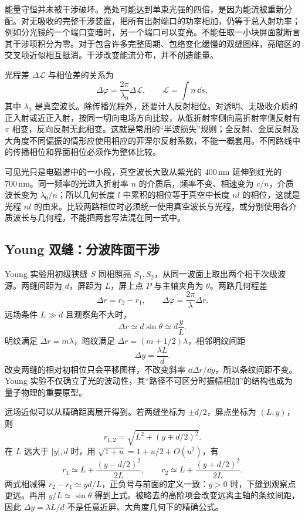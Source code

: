 能量守恒并未被干涉破坏。亮处可能达到单束光强的四倍，是因为能流被重新分配。对无吸收的完整干涉装置，把所有出射端口的功率相加，仍等于总入射功率；例如分光镜的一个端口变暗时，另一个端口可以变亮。不能任取一小块屏面就断言其干涉项积分为零。对于包含许多完整周期、包络变化缓慢的双缝图样，亮暗区的交叉项近似相互抵消。干涉改变能流分布，并不创造能量。

光程差 $\Delta\mathcal L$ 与相位差的关系为
\begin{equation}
 \Delta\varphi=\frac{2\pi}{\lambda_0}\Delta\mathcal L,\qquad
 \mathcal L=\int n\,\dd s,
\end{equation}
其中 $\lambda_0$ 是真空波长。除传播光程外，还要计入反射相位。对透明、无吸收介质的正入射或近正入射，按同一切向电场方向比较，从低折射率侧向高折射率侧反射有 $\pi$ 相变，反向反射无此相变。这就是常用的“半波损失”规则；全反射、金属反射及大角度不同偏振的情形应使用相应的菲涅尔反射系数，不能一概套用。不同路线中的传播相位和界面相位必须作为整体比较。

可见光只是电磁谱中的一小段，真空波长大致从紫光的 $400\,\mathrm{nm}$ 延伸到红光的 $700\,\mathrm{nm}$。同一频率的光进入折射率 $n$ 的介质后，频率不变、相速变为 $c/n$，介质波长变为 $\lambda_0/n$；所以几何长度 $l$ 中累积的相位等于真空中长度 $nl$ 的相位，这就是光程 $nl$ 的由来。比较两路相位时必须统一使用真空波长与光程，或分别使用各介质波长与几何程，不能把两套写法混在同一式中。

\subsection*{Young 双缝：分波阵面干涉}

Young 实验用初级狭缝 $S$ 同相照亮 $S_1,S_2$，从同一波面上取出两个相干次级波源。两缝间距为 $d$，屏距为 $L$，屏上点 $P$ 与主轴夹角为 $\theta$。两路几何程差
\[
 \Delta r=r_2-r_1,\qquad
 \Delta\varphi=\frac{2\pi}{\lambda}\Delta r.
\]
远场条件 $L\gg d$ 且观察角不大时，
\begin{equation}
 \Delta r\simeq d\sin\theta\simeq d\frac yL.
\end{equation}
明纹满足 $\Delta r=m\lambda$，暗纹满足 $\Delta r=(m+1/2)\lambda$，相邻明纹间距
\begin{equation}
 \Delta y=\frac{\lambda L}{d}.
\end{equation}
改变两缝的相对初相位只会平移图样，不改变斜率 $\dd\Delta r/\dd y$，所以条纹间距不变。Young 实验不仅确立了光的波动性，其“路径不可区分时振幅相加”的结构也成为量子物理的重要原型。

远场近似可以从精确距离展开得到。若两缝坐标为 $\pm d/2$，屏点坐标为 $(L,y)$，则
\[
 r_{1,2}=\sqrt{L^2+(y\mp d/2)^2}.
\]
在 $L$ 远大于 $|y|,d$ 时，用 $\sqrt{1+u}=1+u/2+O(u^2)$，有
\[
 r_1\simeq L+\frac{(y-d/2)^2}{2L},\qquad
 r_2\simeq L+\frac{(y+d/2)^2}{2L}.
\]
两式相减得 $r_2-r_1\simeq yd/L$，正负号与前面的定义一致：$y>0$ 时，下缝到观察点更远。再用 $y/L\simeq\sin\theta$ 得到上式。被略去的高阶项会改变远离主轴的条纹间距，因此 $\Delta y=\lambda L/d$ 不是任意近屏、大角度几何下的精确公式。

